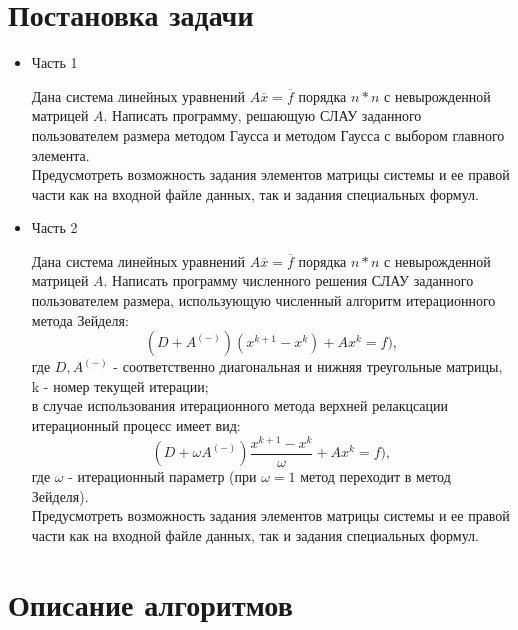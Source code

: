 \documentclass[a4paper,12pt,titlepage,finall]{article}
\begin{document}
\section{Постановка задачи}
\begin{itemize}
\item Часть 1

Дана система линейных уравнений $A\overline{x}=\overline{f}$  порядка $n * n$ с невырожденной матрицей $A$. Написать программу, решающую СЛАУ заданного пользователем размера методом Гаусса и методом Гаусса с выбором главного элемента.\\
Предусмотреть возможность задания элементов матрицы системы и ее правой части как на входной файле данных, так и задания специальных формул.
~\\

\item Часть 2

Дана система линейных уравнений $A\overline{x}=\overline{f}$  порядка $n * n$ с невырожденной матрицей $A$. Написать программу численного решения СЛАУ заданного пользователем размера, использующую численный алгоритм итерационного метода Зейделя:
$$(D + A ^ {(-)})(x^{k+1}-x^{k}) + Ax^{k} = f),$$
где $D, A  ^ {(-)} $ - соответственно диагональная и нижняя треугольные матрицы, k - номер текущей итерации;\\
в случае использования итерационного метода верхней релакцсации итерационный процесс имеет вид:
$$ (D + \omega A ^ {(-)}) \frac{x^{k+1}-x^{k}}{\omega} + Ax^{k} = f),$$
где $\omega$ - итерационный параметр (при  $\omega = 1$ метод переходит в метод Зейделя).\\
Предусмотреть возможность задания элементов матрицы системы и ее правой части как на входной файле данных, так и задания специальных формул.

\end{itemize}

\newpage


\section{Описание алгоритмов}
\end{document}
